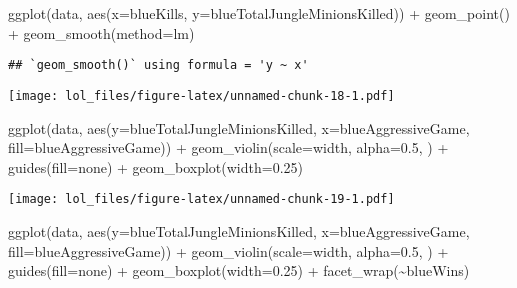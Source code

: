 \documentclass[
]{article}
\newenvironment{Shaded}{\begin{snugshade}}{\end{snugshade}}
\newcommand{\AttributeTok}[1]{\textcolor[rgb]{0.77,0.63,0.00}{#1}}
\newcommand{\FloatTok}[1]{\textcolor[rgb]{0.00,0.00,0.81}{#1}}
\newcommand{\FunctionTok}[1]{\textcolor[rgb]{0.00,0.00,0.00}{#1}}
\newcommand{\NormalTok}[1]{#1}
\newcommand{\SpecialCharTok}[1]{\textcolor[rgb]{0.00,0.00,0.00}{#1}}
\newcommand{\StringTok}[1]{\textcolor[rgb]{0.31,0.60,0.02}{#1}}
\begin{document}
\begin{Shaded}
\begin{Highlighting}[]
\FunctionTok{ggplot}\NormalTok{(data, }\FunctionTok{aes}\NormalTok{(}\AttributeTok{x=}\NormalTok{blueKills, }\AttributeTok{y=}\NormalTok{blueTotalJungleMinionsKilled)) }\SpecialCharTok{+} 
  \FunctionTok{geom\_point}\NormalTok{() }\SpecialCharTok{+}
  \FunctionTok{geom\_smooth}\NormalTok{(}\AttributeTok{method=}\StringTok{\textquotesingle{}lm\textquotesingle{}}\NormalTok{)}
\end{Highlighting}
\end{Shaded}

\begin{verbatim}
## `geom_smooth()` using formula = 'y ~ x'
\end{verbatim}

\texttt{[image: lol\_files/figure-latex/unnamed-chunk-18-1.pdf]}

\begin{Shaded}
\begin{Highlighting}[]
\FunctionTok{ggplot}\NormalTok{(data, }\FunctionTok{aes}\NormalTok{(}\AttributeTok{y=}\NormalTok{blueTotalJungleMinionsKilled, }\AttributeTok{x=}\NormalTok{blueAggressiveGame, }\AttributeTok{fill=}\NormalTok{blueAggressiveGame)) }\SpecialCharTok{+} 
  \FunctionTok{geom\_violin}\NormalTok{(}\AttributeTok{scale=}\StringTok{\textquotesingle{}width\textquotesingle{}}\NormalTok{, }\AttributeTok{alpha=}\FloatTok{0.5}\NormalTok{, ) }\SpecialCharTok{+}
  \FunctionTok{guides}\NormalTok{(}\AttributeTok{fill=}\StringTok{\textquotesingle{}none\textquotesingle{}}\NormalTok{) }\SpecialCharTok{+} 
  \FunctionTok{geom\_boxplot}\NormalTok{(}\AttributeTok{width=}\FloatTok{0.25}\NormalTok{)}
\end{Highlighting}
\end{Shaded}

\texttt{[image: lol\_files/figure-latex/unnamed-chunk-19-1.pdf]}

\begin{Shaded}
\begin{Highlighting}[]
\FunctionTok{ggplot}\NormalTok{(data, }\FunctionTok{aes}\NormalTok{(}\AttributeTok{y=}\NormalTok{blueTotalJungleMinionsKilled, }\AttributeTok{x=}\NormalTok{blueAggressiveGame, }\AttributeTok{fill=}\NormalTok{blueAggressiveGame)) }\SpecialCharTok{+} 
  \FunctionTok{geom\_violin}\NormalTok{(}\AttributeTok{scale=}\StringTok{\textquotesingle{}width\textquotesingle{}}\NormalTok{, }\AttributeTok{alpha=}\FloatTok{0.5}\NormalTok{, ) }\SpecialCharTok{+}
  \FunctionTok{guides}\NormalTok{(}\AttributeTok{fill=}\StringTok{\textquotesingle{}none\textquotesingle{}}\NormalTok{) }\SpecialCharTok{+} 
  \FunctionTok{geom\_boxplot}\NormalTok{(}\AttributeTok{width=}\FloatTok{0.25}\NormalTok{) }\SpecialCharTok{+}
  \FunctionTok{facet\_wrap}\NormalTok{(}\SpecialCharTok{\textasciitilde{}}\NormalTok{blueWins)}
\end{Highlighting}
\end{Shaded}
\end{document}
